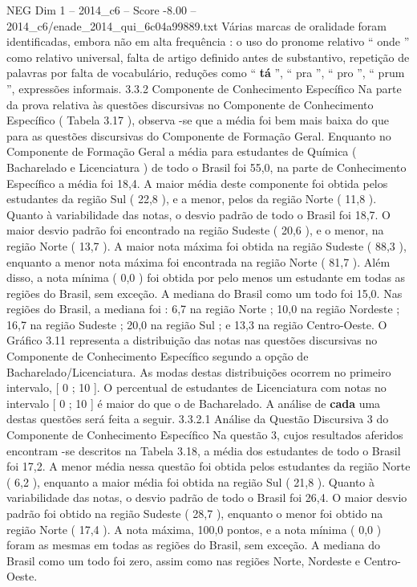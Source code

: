 \begin{textsample}{NEG Dim 1 – 2014\_c6 – Score -8.00 – 2014\_c6/enade\_2014\_qui\_6c04a99889.txt}
Várias marcas de oralidade foram identificadas, embora não em alta frequência : o uso do pronome relativo “ onde ” como relativo universal, falta de artigo definido antes de substantivo, repetição de palavras por falta de vocabulário, reduções como “ \textbf{tá} ”, “ pra ”, “ pro ”, “ prum ”, expressões informais. 3.3.2 Componente de Conhecimento Específico Na parte da prova relativa às questões discursivas no Componente de Conhecimento Específico ( Tabela 3.17 ), observa -se que a média foi bem mais baixa do que para as questões discursivas do Componente de Formação Geral.
Enquanto no Componente de Formação Geral a média para estudantes de Química ( Bacharelado e Licenciatura ) de todo o Brasil foi 55,0, na parte de Conhecimento Específico a média foi 18,4.
A maior média deste componente foi obtida pelos estudantes da região Sul ( 22,8 ), e a menor, pelos da região Norte ( 11,8 ).
Quanto à variabilidade das notas, o desvio padrão de todo o Brasil foi 18,7.
O maior desvio padrão foi encontrado na região Sudeste ( 20,6 ), e o menor, na região Norte ( 13,7 ).
A maior nota máxima foi obtida na região Sudeste ( 88,3 ), enquanto a menor nota máxima foi encontrada na região Norte ( 81,7 ).
Além disso, a nota mínima ( 0,0 ) foi obtida por pelo menos um estudante em todas as regiões do Brasil, sem exceção.
A mediana do Brasil como um todo foi 15,0.
Nas regiões do Brasil, a mediana foi : 6,7 na região Norte ; 10,0 na região Nordeste ; 16,7 na região Sudeste ; 20,0 na região Sul ; e 13,3 na região Centro-Oeste.
O Gráfico 3.11 representa a distribuição das notas nas questões discursivas no Componente de Conhecimento Específico segundo a opção de Bacharelado/Licenciatura.
As modas destas distribuições ocorrem no primeiro intervalo, [ 0 ; 10 ].
O percentual de estudantes de Licenciatura com notas no intervalo [ 0 ; 10 ] é maior do que o de Bacharelado.
A análise de \textbf{cada} uma destas questões será feita a seguir. 3.3.2.1 Análise da Questão Discursiva 3 do Componente de Conhecimento Específico Na questão 3, cujos resultados aferidos encontram -se descritos na Tabela 3.18, a média dos estudantes de todo o Brasil foi 17,2.
A menor média nessa questão foi obtida pelos estudantes da região Norte ( 6,2 ), enquanto a maior média foi obtida na região Sul ( 21,8 ).
Quanto à variabilidade das notas, o desvio padrão de todo o Brasil foi 26,4.
O maior desvio padrão foi obtido na região Sudeste ( 28,7 ), enquanto o menor foi obtido na região Norte ( 17,4 ).
A nota máxima, 100,0 pontos, e a nota mínima ( 0,0 ) foram as mesmas em todas as regiões do Brasil, sem exceção.
A mediana do Brasil como um todo foi zero, assim como nas regiões Norte, Nordeste e Centro-Oeste.

\end{textsample}
